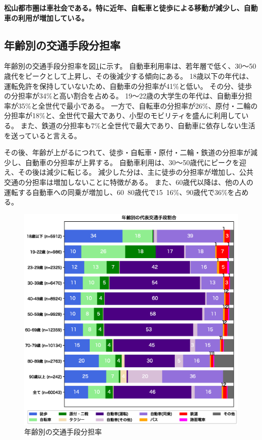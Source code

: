 \documentclass[a4paper,12pt, uplatex]{jsbook}
\begin{document}
\color{red}
\begin{framed}
\noindent
\textbf{\large 松山都市圏は車社会である。特に近年、自転車と徒歩による移動が減少し、自動車の利用が増加している。}
\end{framed}
\color{black}


\clearpage
\subsection{年齢別の交通手段分担率}
年齢別の交通手段分担率を図\ref{fig:mode_share_age}に示す。
自動車利用率は、若年層で低く、30〜50歳代をピークとして上昇し、その後減少する傾向にある。
18歳以下の年代は、運転免許を保持していないため、自動車の分担率が41\%と低い。
その分、徒歩の分担率が34\%と高い割合を占める。
19〜22歳の大学生の年代は、自動車分担率が35\%と全世代で最小である。
一方で、自転車の分担率が26\%、原付・二輪の分担率が18\%と、全世代で最大であり、小型のモビリティを盛んに利用している。
また、鉄道の分担率も7\%と全世代で最大であり、自動車に依存しない生活を送っていると言える。

その後、年齢が上がるにつれて、徒歩・自転車・原付・二輪・鉄道の分担率が減少し、自動車の分担率が上昇する。
自動車利用は、30〜50歳代にピークを迎え、その後は減少に転じる。
減少した分は、主に徒歩の分担率が増加し、公共交通の分担率は増加しないことに特徴がある。
また、60歳代以降は、他の人の運転する自動車への同乗が増加し、60~80歳代で15~16\%、90歳代で36\%を占める。

\begin{figure}[htbp]
    \centering
    \includegraphics[width=1.0\textwidth]{picture/mode_share_age.eps}
    \caption{年齢別の交通手段分担率}
    \label{fig:mode_share_age}
\end{figure}
\end{document}
